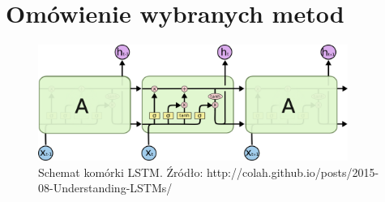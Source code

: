 \documentclass[oneside, mag]{mgr}
\begin{document}
\chapter{Omówienie wybranych metod}

\begin{figure}
\centering
	\includegraphics[width=0.90\textwidth]{img/lstm_colah.png}
	\caption{Schemat komórki LSTM. Źródło: http://colah.github.io/posts/2015-08-Understanding-LSTMs/}
	\label{fig:lstm}
\end{figure}




\tableofcontents

\listoffigures
\end{document}
